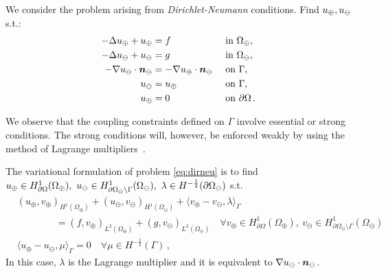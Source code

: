 \documentclass[r]{siamart171218}
\begin{document}
We consider the problem arising from \emph{Dirichlet-Neumann} conditions. Find $u_{\oplus},u_{\ominus}$ s.t.:
\begin{subequations}\label{eq:dirneu}
\begin{align}
\label{eq:dirneu1}
- \Delta \up  + \up &= f  && \text{ in } \Omega_{\oplus},\\
\label{eq:dirneu2}
- \Delta \uf  + \uf &= g  && \text{ in } \Omega_\ominus,\\
\label{eq:dirneu3}
-\nabla \uf \cdot \nn_{\ominus} &= -\nabla \up \cdot \nn_{\ominus}  && \text{ on } \Gamma,\\
\label{eq:dirneu4}
\uf &= \up && \text{ on }  \Gamma,\\
\label{eq:dirneu5}
\up &= 0 && \text{ on } \partial \Omega\,.
\end{align}
\end{subequations}

We observe that the coupling constraints defined on $\Gamma$ involve essential or strong conditions.
The strong conditions will, however, be enforced weakly by using the method of Lagrange multipliers~\cite{MR359352}.

The variational formulation of problem \eqref{eq:dirneu}
is to find $u_{\oplus} \in H^1_{\partial\Omega}(\Omega_\oplus), \ u_{\ominus} \in H^1_{\partial\Omega_\ominus\setminus\Gamma}(\Omega_\ominus), \ \lambda \in H^{-\frac 1 2}(\partial\Omega_\ominus)$ s.t.
\begin{subequations}\label{eq:weak_dirneu}
\begin{align}
&(u_\oplus,v_\oplus)_{H^1(\Omega_\oplus)} + (u_\ominus,v_\ominus)_{H^1(\Omega_\ominus)} 
+ \langle  v_\oplus - v_\ominus, \lambda \rangle_{\Gamma} 
\\
\nonumber
&\qquad\qquad = (f,v_\oplus)_{L^2(\Omega_\oplus)} + (g,v_\ominus)_{L^2(\Omega_\ominus)}
\quad \forall v_\oplus \in H^1_{\partial\Omega}(\Omega_\oplus), \ v_\ominus \in H^1_{\partial\Omega_\ominus\setminus\Gamma}(\Omega_\ominus)
\\
& \langle u_\oplus - u_\ominus, \mu \rangle_{\Gamma} = 0
\quad \forall  \mu \in H^{-\frac 1 2}(\Gamma)\,,
\end{align}
\end{subequations}
In this case, $\lambda$ is the Lagrange multiplier and it is equivalent to $\nabla u_{\ominus} \cdot \boldsymbol n_\ominus$.
\end{document}
